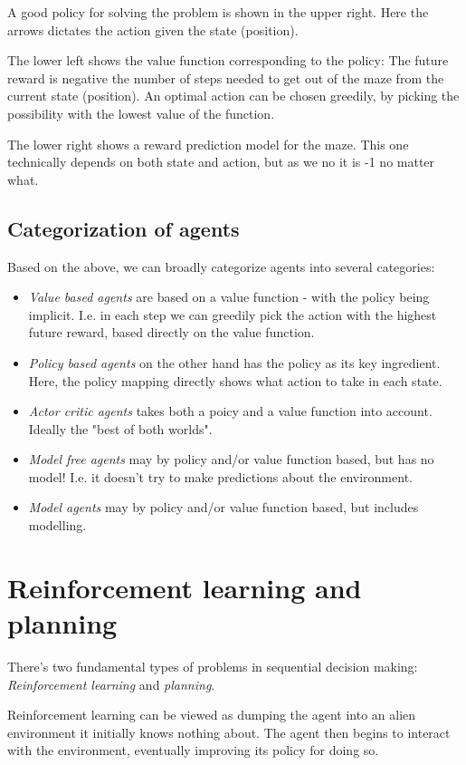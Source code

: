 \documentclass[12pt, a4paper]{article}
\numberwithin{equation}{section}
\begin{document}
A good policy for solving the problem is shown in the upper right. Here the arrows dictates the action given the state (position).

The lower left shows the value function corresponding to the policy: The future reward is negative the number of steps needed to get out of the maze from the current state (position). An optimal action can be chosen greedily, by picking the possibility with the lowest value of the function.

The lower right shows a reward prediction model for the maze. This one technically depends on both state and action, but as we no it is -1 no matter what.

\subsection{Categorization of agents}
Based on the above, we can broadly categorize agents into several categories:
\begin{itemize}
\item\textit{Value based agents} are based on a value function - with the policy being implicit. I.e. in each step we can greedily pick the action with the highest future reward, based directly on the value function.
\item\textit{Policy based agents} on the other hand has the policy as its key ingredient. Here, the policy mapping directly shows what action to take in each state.
\item\textit{Actor critic agents} takes both a poicy and a value function into account. Ideally the "best of both worlds".
\item\textit{Model free agents} may by policy and/or value function based, but has no model! I.e. it doesn't try to make predictions about the environment.
\item\textit{Model agents} may by policy and/or value function based, but includes modelling.
\end{itemize}

\section{Reinforcement learning and planning}
There's two fundamental types of problems in sequential decision making: \textit{Reinforcement learning} and \textit{planning}.

Reinforcement learning can be viewed as dumping the agent into an alien environment it initially knows nothing about. The agent then begins to interact with the environment, eventually improving its policy for doing so.
\end{document}
